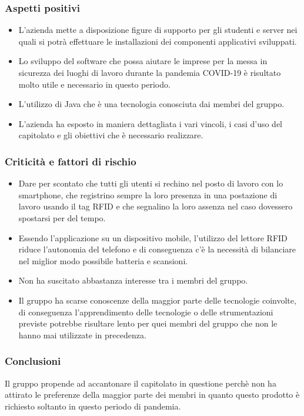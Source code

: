 		\subsubsection{Aspetti positivi}
			\begin{itemize}
				\item L’azienda mette a disposizione figure di supporto per gli studenti e server nei quali si potrà effettuare le installazioni dei componenti applicativi sviluppati.
				\item Lo sviluppo del software che possa aiutare le imprese per la messa in sicurezza dei luoghi di lavoro durante la pandemia COVID-19 è risultato molto utile e necessario in questo periodo.
				\item L’utilizzo di Java che è una tecnologia conosciuta dai membri del gruppo.
				\item L’azienda ha esposto in maniera dettagliata i vari vincoli, i casi d’uso del capitolato e gli obiettivi che è necessario realizzare.
			\end{itemize}
			
		\subsubsection{Criticità e fattori di rischio}
			\begin{itemize}
				\item Dare per scontato che tutti gli utenti si rechino nel posto di lavoro con lo smartphone, che registrino sempre la loro presenza in una postazione di lavoro usando il tag RFID e che segnalino la loro assenza nel caso dovessero spostarsi per del tempo.
				\item Essendo l’applicazione su un dispositivo mobile, l’utilizzo del lettore RFID riduce l’autonomia del telefono e di conseguenza c’è la necessità di bilanciare nel miglior modo possibile batteria e scansioni.
				\item Non ha suscitato abbastanza interesse tra i membri del gruppo.
				\item Il gruppo ha scarse conoscenze della maggior parte delle tecnologie coinvolte, di conseguenza l’apprendimento delle tecnologie o delle strumentazioni previste potrebbe risultare lento per quei membri del gruppo che non le hanno mai utilizzate in precedenza. 
			\end{itemize}
		\subsubsection{Conclusioni}
			Il gruppo propende ad accantonare il capitolato in questione perchè non ha attirato le preferenze della maggior parte dei membri in quanto questo prodotto è richiesto soltanto in questo periodo di pandemia.
\newpage
				
